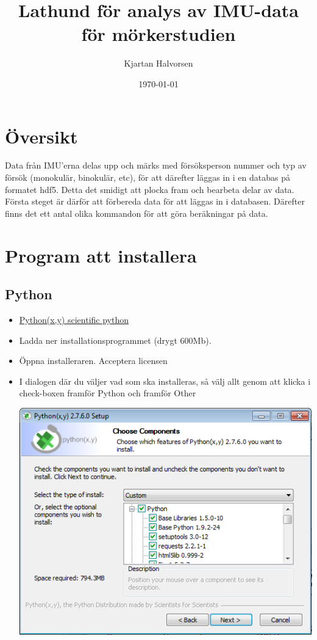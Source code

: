 \documentclass[captions=tableheading]{scrartcl}
\author{Kjartan Halvorsen}
\date{\today}
\title{Lathund för analys av IMU-data för mörkerstudien}
\begin{document}
\maketitle
\tableofcontents


\section{Översikt}
\label{sec-1}
Data från IMU'erna delas upp och märks med försöksperson nummer och typ av försök (monokulär, binokulär, etc), för att därefter läggas in i en databas på formatet hdf5. Detta det smidigt att plocka fram och bearbeta delar av data. Första steget är därför att förbereda data för att läggas in i databasen. Därefter finns det ett antal olika kommandon för att göra beräkningar på data.
\section{Program att installera}
\label{sec-2}
\subsection{Python}
\label{sec-2-1}
\begin{itemize}
\item \href{https://code.google.com/p/pythonxy/wiki/Downloads?tm\%3D2}{Python(x,y) scientific python}
\item Ladda ner installationsprogrammet (drygt 600Mb).
\item Öppna installeraren. Acceptera licensen
\item I dialogen där du väljer vad som ska installeras, så välj allt genom att klicka i check-boxen framför Python och framför Other

\includegraphics[width=0.4\linewidth]{xyinstall}
\end{itemize}
\end{document}
